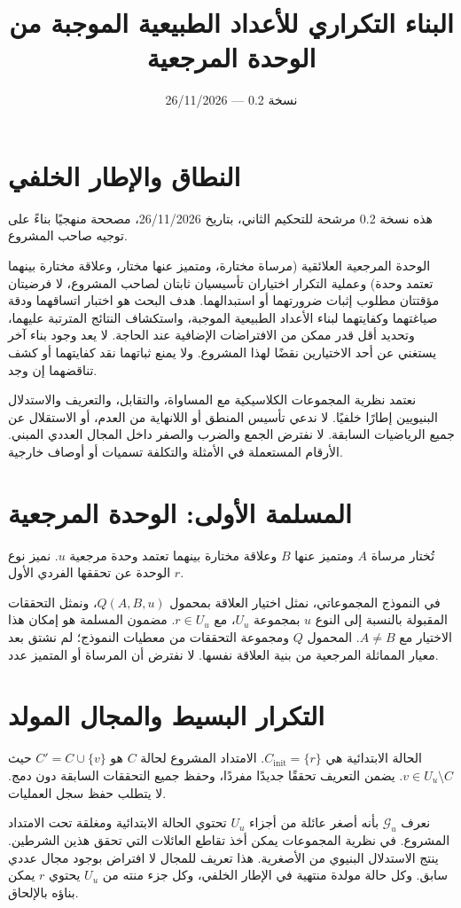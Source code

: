 \documentclass[12pt,a4paper]{article}
\title{البناء التكراري للأعداد الطبيعية الموجبة من الوحدة المرجعية}
\author{}
\date{نسخة \textenglish{0.2} — \textenglish{26/11/2026}}
\begin{document}
\maketitle
\section{النطاق والإطار الخلفي}
هذه نسخة 0.2 مرشحة للتحكيم الثاني، بتاريخ 26/11/2026، مصححة منهجيًا بناءً على توجيه صاحب المشروع.

الوحدة المرجعية العلائقية (مرساة مختارة، ومتميز عنها مختار، وعلاقة مختارة بينهما تعتمد وحدة) وعملية التكرار اختياران تأسيسيان ثابتان لصاحب المشروع، لا فرضيتان مؤقتتان مطلوب إثبات ضرورتهما أو استبدالهما. هدف البحث هو اختبار اتساقهما ودقة صياغتهما وكفايتهما لبناء الأعداد الطبيعية الموجبة، واستكشاف النتائج المترتبة عليهما، وتحديد أقل قدر ممكن من الافتراضات الإضافية عند الحاجة. لا يعد وجود بناء آخر يستغني عن أحد الاختيارين نقضًا لهذا المشروع. ولا يمنع ثباتهما نقد كفايتهما أو كشف تناقضهما إن وجد.

 نعتمد نظرية المجموعات الكلاسيكية مع المساواة، والتقابل، والتعريف والاستدلال البنيويين إطارًا خلفيًا. لا ندعي تأسيس المنطق أو اللانهاية من العدم، أو الاستقلال عن جميع الرياضيات السابقة. لا نفترض الجمع والضرب والصفر داخل المجال العددي المبني. الأرقام المستعملة في الأمثلة والتكلفة تسميات أو أوصاف خارجية.

\section{المسلمة الأولى: الوحدة المرجعية}
تُختار مرساة $A$ ومتميز عنها $B$ وعلاقة مختارة بينهما تعتمد وحدة مرجعية $u$. نميز نوع الوحدة عن تحققها الفردي الأول $r$.

في النموذج المجموعاتي، نمثل اختيار العلاقة بمحمول $Q(A,B,u)$، ونمثل التحققات المقبولة بالنسبة إلى النوع $u$ بمجموعة $U_u$، مع $r\in U_u$. مضمون المسلمة هو إمكان هذا الاختيار مع $A\ne B$. المحمول $Q$ ومجموعة التحققات من معطيات النموذج؛ لم نشتق بعد معيار المماثلة المرجعية من بنية العلاقة نفسها. لا نفترض أن المرساة أو المتميز عدد.

\section{التكرار البسيط والمجال المولد}
الحالة الابتدائية هي $C_{\mathrm{init}}=\{r\}$. الامتداد المشروع لحالة $C$ هو $C'=C\cup\{v\}$ حيث $v\in U_u\setminus C$. يضمن التعريف تحققًا جديدًا مفردًا، وحفظ جميع التحققات السابقة دون دمج. لا يتطلب حفظ سجل العمليات.

نعرف $\mathcal G_u$ بأنه أصغر عائلة من أجزاء $U_u$ تحتوي الحالة الابتدائية ومغلقة تحت الامتداد المشروع. في نظرية المجموعات يمكن أخذ تقاطع العائلات التي تحقق هذين الشرطين. ينتج الاستدلال البنيوي من الأصغرية. هذا تعريف للمجال لا افتراض بوجود مجال عددي سابق. وكل حالة مولدة منتهية في الإطار الخلفي، وكل جزء منته من $U_u$ يحتوي $r$ يمكن بناؤه بالإلحاق.
\end{document}
